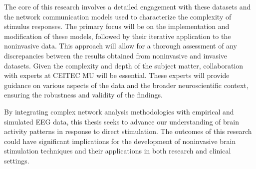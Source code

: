 The core of this research involves a detailed engagement with these datasets and the network communication models used to characterize the complexity of stimulus responses. The primary focus will be on the implementation and modification of these models, followed by their iterative application to the noninvasive data. This approach will allow for a thorough assessment of any discrepancies between the results obtained from noninvasive and invasive datasets. Given the complexity and depth of the subject matter, collaboration with experts at CEITEC MU will be essential. These experts will provide guidance on various aspects of the data and the broader neuroscientific context, ensuring the robustness and validity of the findings.

By integrating complex network analysis methodologies with empirical and simulated EEG data, this thesis seeks to advance our understanding of brain activity patterns in response to direct stimulation. The outcomes of this research could have significant implications for the development of noninvasive brain stimulation techniques and their applications in both research and clinical settings.


